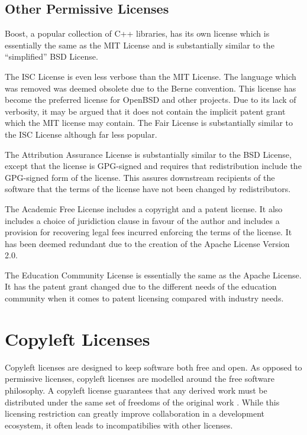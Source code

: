 \documentclass[12pt,letterpaper]{article}
\begin{document}
\subsection{Other Permissive Licenses}

Boost, a popular collection of C++ libraries, has its own license which is essentially the same as the MIT License and is substantially similar to the ``simplified'' BSD License. \cite{boost}

The ISC License is even less verbose than the MIT License. The language which was removed was deemed obsolete due to the Berne convention. This license has become the preferred license for OpenBSD and other projects.\cite{openbsd} Due to its lack of verbosity, it may be argued that it does not contain the implicit patent grant which the MIT license may contain. The Fair License is substantially similar to the ISC License although far less popular.\cite{fair}

The Attribution Assurance License is substantially similar to the BSD License, except that the license is GPG-signed and requires that redistribution include the GPG-signed form of the license. This assures downstream recipients of the software that the terms of the license have not been changed by redistributors.\cite{attrassur}

The Academic Free License includes a copyright and a patent license. It also includes a choice of juridiction clause in favour of the author and includes a provision for recovering legal fees incurred enforcing the terms of the license. It has been deemed redundant due to the creation of the Apache License Version 2.0.\cite{academic}

The Education Community License is essentially the same as the Apache License. It has the patent grant changed due to the different needs of the education community when it comes to patent licensing compared with industry needs.\cite{education}

\section{Copyleft Licenses}

Copyleft licenses are designed to keep software both free and open. As opposed to permissive licenses, copyleft licenses are modelled around the free software philosophy. A copyleft license guarantees that any derived work must be distributed under the same set of freedoms of the original work \cite{copyleft}. While this licensing restriction can greatly improve collaboration in a development ecosystem, it often leads to incompatibilies with other licenses.
\end{document}
